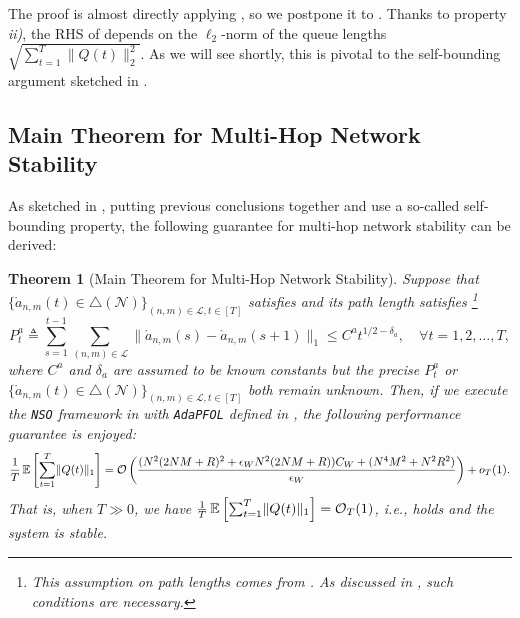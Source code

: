 \documentclass[11pt,fullpage,letterpaper]{article} %
\newtheorem{theorem}{Theorem}[section]
\renewcommand{\bm}[1]{#1}%
\renewcommand{\O}{\operatorname{\mathcal O}}
\newcommand{\E}{\operatornamewithlimits{\mathbb{E}}}
\newcommand{\mN}{{\mathcal N}}
\newcommand{\mL}{{\mathcal L}}
\newcommand{\SSAlg}{\texttt{NSO}\xspace}
\newcommand{\OLOAlg}{\texttt{AdaPFOL}\xspace}
\begin{document}
The proof is almost directly applying , so we postpone it to .
Thanks to property \textit{ii)}, the RHS of  depends on the $\ell_2$-norm of the queue lengths $\sqrt{\sum_{t=1}^T \lVert \bm Q(t)\rVert_2^2}$. As we will see shortly, this is pivotal to the self-bounding argument sketched in .

\subsection{Main Theorem for Multi-Hop Network Stability}\label{sec:multi-hop stability main theorem}
As sketched in , putting previous conclusions together and use a so-called {self-bounding} property, the following guarantee for multi-hop network stability can be derived:
\begin{theorem}[Main Theorem for Multi-Hop Network Stability]\label{thm:multi-hop stability main theorem}
Suppose that $\{\mathring{\bm a}_{n,m}(t)\in \triangle(\mN)\}_{(n,m)\in \mL,t\in [T]}$ satisfies  and its path length satisfies \footnote{This assumption on path lengths comes from \citep[Assumption 2]{huang2023queue}. As discussed in , such conditions are necessary.}
\begin{equation}\label{eq:network stability path length}
P_t^a\triangleq \sum_{s=1}^{t-1} \sum_{(n,m)\in \mL} \lVert \mathring{\bm a}_{n,m}(s) - \mathring{\bm a}_{n,m}(s+1)\rVert_1\le C^a t^{1/2 - \delta_a},\quad \forall t=1,2,\ldots,T,
\end{equation}
where $C^a$ and $\delta_a$ are assumed to be known constants but the precise $P_t^a$ or $\{\mathring{\bm a}_{n,m}(t)\in \triangle(\mN)\}_{(n,m)\in \mL,t\in [T]}$ both remain unknown.
Then, if we execute the \SSAlg framework in  with \OLOAlg defined in , the following performance guarantee is enjoyed:
\begin{equation*}
\frac 1T\E\left [\sum_{t=1}^T \lVert \bm Q(t)\rVert_1\right ]=\O\left (\frac{(N^2(2NM+R)^2 + \epsilon_W N^2 (2NM+R))C_W + (N^4 M^2 + N^2 R^2)}{\epsilon_W}\right )+o_T(1).
\end{equation*}
That is, when $T\gg 0$, we have $\frac{1}{T} \E\left [\sum_{t=1}^T \lVert \bm Q(t)\rVert_1\right ]=\O_T(1)$, \textit{i.e.},  holds and the system is stable.
\end{theorem}
\end{document}
